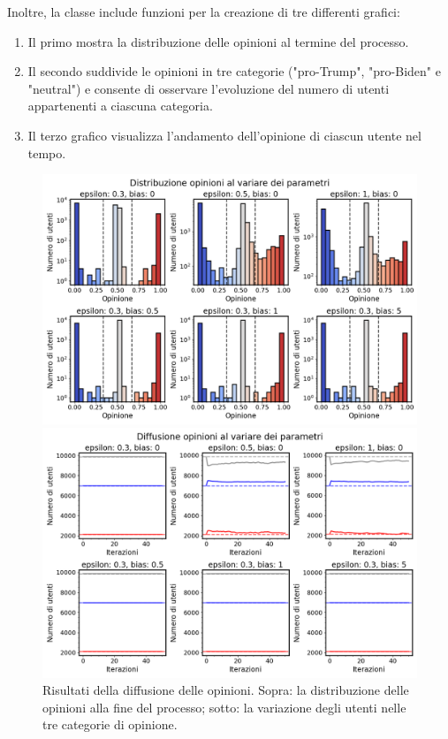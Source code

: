 \documentclass[sigchi]{acmart}
\begin{document}
Inoltre, la classe include funzioni per la creazione di tre differenti grafici:
\begin{enumerate}
    \item Il primo mostra la distribuzione delle opinioni al termine del processo.
    \item Il secondo suddivide le opinioni in tre categorie ("pro-Trump", "pro-Biden" e "neutral") e consente di osservare l'evoluzione del numero di utenti appartenenti a ciascuna categoria.
    \item Il terzo grafico visualizza l'andamento dell'opinione di ciascun utente nel tempo.
\end{enumerate}

\begin{figure}[h]
    \centering
    \begin{minipage}{0.48\textwidth}
        \centering
        \includegraphics[width=\linewidth]{img/Distribuzione opinioni al variare dei parametri.png}
    \end{minipage}
    \hfill
    \begin{minipage}{0.48\textwidth}
        \centering
        \includegraphics[width=\linewidth]{img/Diffusione opinioni al variare dei parametri.png}
    \end{minipage}
    \caption{Risultati della diffusione delle opinioni. Sopra: la distribuzione delle opinioni alla fine del processo; sotto: la variazione degli utenti nelle tre categorie di opinione. \label{fig:opinion_diffusion}}
\end{figure}
\end{document}
